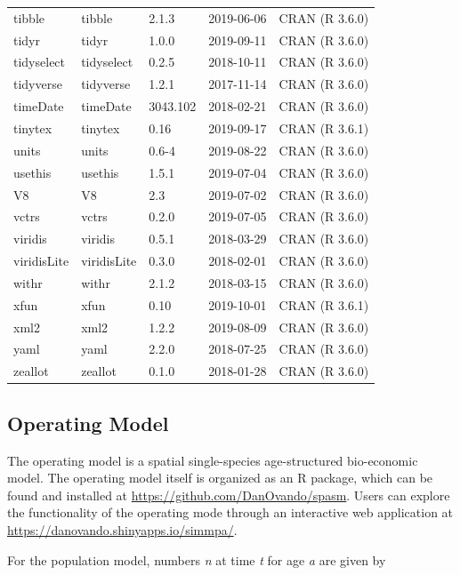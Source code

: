 \documentclass[]{article}
\begin{document}
\begin{longtable}[t]{lllll}
\addlinespace
tibble & tibble & 2.1.3 & 2019-06-06 & CRAN (R 3.6.0)\\
tidyr & tidyr & 1.0.0 & 2019-09-11 & CRAN (R 3.6.0)\\
tidyselect & tidyselect & 0.2.5 & 2018-10-11 & CRAN (R 3.6.0)\\
tidyverse & tidyverse & 1.2.1 & 2017-11-14 & CRAN (R 3.6.0)\\
timeDate & timeDate & 3043.102 & 2018-02-21 & CRAN (R 3.6.0)\\
\addlinespace
tinytex & tinytex & 0.16 & 2019-09-17 & CRAN (R 3.6.1)\\
units & units & 0.6-4 & 2019-08-22 & CRAN (R 3.6.0)\\
usethis & usethis & 1.5.1 & 2019-07-04 & CRAN (R 3.6.0)\\
V8 & V8 & 2.3 & 2019-07-02 & CRAN (R 3.6.0)\\
vctrs & vctrs & 0.2.0 & 2019-07-05 & CRAN (R 3.6.0)\\
\addlinespace
viridis & viridis & 0.5.1 & 2018-03-29 & CRAN (R 3.6.0)\\
viridisLite & viridisLite & 0.3.0 & 2018-02-01 & CRAN (R 3.6.0)\\
withr & withr & 2.1.2 & 2018-03-15 & CRAN (R 3.6.0)\\
xfun & xfun & 0.10 & 2019-10-01 & CRAN (R 3.6.1)\\
xml2 & xml2 & 1.2.2 & 2019-08-09 & CRAN (R 3.6.0)\\
\addlinespace
yaml & yaml & 2.2.0 & 2018-07-25 & CRAN (R 3.6.0)\\
zeallot & zeallot & 0.1.0 & 2018-01-28 & CRAN (R 3.6.0)\\*
\end{longtable}

\hypertarget{operating-model}{%
\subsection{Operating Model}\label{operating-model}}

The operating model is a spatial single-species age-structured bio-economic model. The operating model itself is organized as an R package, which can be found and installed at \url{https://github.com/DanOvando/spasm}. Users can explore the functionality of the operating mode through an interactive web application at \url{https://danovando.shinyapps.io/simmpa/}.

For the population model, numbers \emph{n} at time \emph{t} for age \emph{a} are given by
\end{document}
